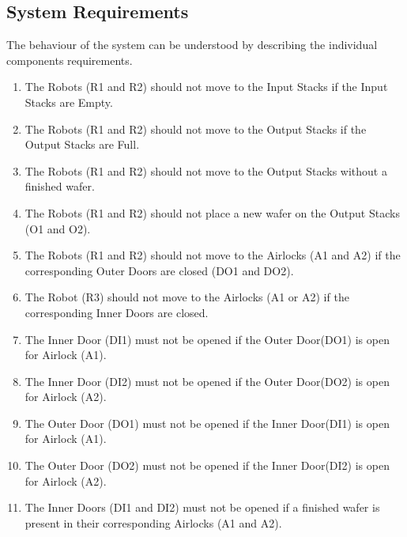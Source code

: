 \documentclass[a4paper,12pt]{article}
\begin{document}
\subsection{System Requirements}
The behaviour of the system can be understood by describing the individual components requirements.
\begin{enumerate}

\item The Robots (R1 and R2) should not move to the Input Stacks if the Input Stacks are Empty.

\item The Robots (R1 and R2) should not move to the Output Stacks if the Output Stacks are Full.

\item The Robots (R1 and R2) should not move to the Output Stacks without a finished wafer.

\item The Robots (R1 and R2) should not place a new wafer on the Output Stacks (O1 and O2).


\item The Robots (R1 and R2) should not move to the Airlocks (A1 and A2) if the corresponding Outer Doors are closed (DO1 and DO2).

\item The Robot (R3) should not move to the Airlocks (A1 or A2) if the corresponding Inner Doors are closed.

\item The Inner Door (DI1) must not be opened if the Outer Door(DO1) is open for Airlock (A1).

\item The Inner Door (DI2) must not be opened if the Outer Door(DO2) is open for Airlock (A2).

\item The Outer Door (DO1) must not be opened if the Inner Door(DI1) is open for Airlock (A1).

\item The Outer Door (DO2) must not be opened if the Inner Door(DI2) is open for Airlock (A2).

\item The Inner Doors (DI1 and DI2) must not be opened if a finished wafer is present in their corresponding Airlocks (A1 and A2).


\end{enumerate}
\end{document}
